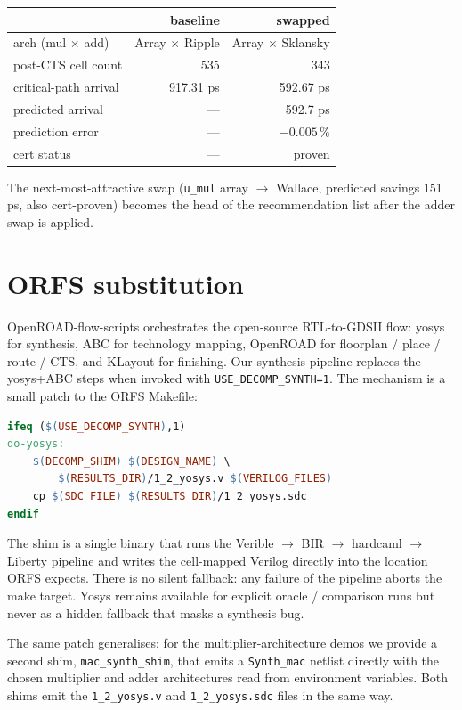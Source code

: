 \documentclass[11pt,a4paper]{article}
\begin{document}
\begin{center}
\begin{tabular}{l r r}
\toprule
& baseline & swapped \\
\midrule
arch (mul $\times$ add) & Array $\times$ Ripple & Array $\times$ Sklansky \\
post-CTS cell count & 535 & 343 \\
critical-path arrival & 917.31 ps & 592.67 ps \\
predicted arrival & --- & 592.7 ps \\
prediction error & --- & $-0.005$\,\% \\
cert status & --- & proven \\
\bottomrule
\end{tabular}
\end{center}

The next-most-attractive swap (\texttt{u\_mul} array $\to$
Wallace, predicted savings 151 ps, also cert-proven) becomes the
head of the recommendation list after the adder swap is applied.

\section{ORFS substitution}
\label{sec:orfs}

OpenROAD-flow-scripts orchestrates the open-source RTL-to-GDSII
flow: yosys for synthesis, ABC for technology mapping, OpenROAD
for floorplan / place / route / CTS, and KLayout for finishing.
Our synthesis pipeline replaces the yosys+ABC steps when invoked
with \texttt{USE\_DECOMP\_SYNTH=1}.  The mechanism is a small
patch to the ORFS Makefile:

\begin{lstlisting}[language=make]
ifeq ($(USE_DECOMP_SYNTH),1)
do-yosys:
    $(DECOMP_SHIM) $(DESIGN_NAME) \
        $(RESULTS_DIR)/1_2_yosys.v $(VERILOG_FILES)
    cp $(SDC_FILE) $(RESULTS_DIR)/1_2_yosys.sdc
endif
\end{lstlisting}

The shim is a single binary that runs the Verible
$\to$ BIR $\to$ hardcaml $\to$ Liberty pipeline and writes the
cell-mapped Verilog directly into the location ORFS expects.
There is no silent fallback: any failure of the pipeline aborts
the make target.  Yosys remains available for explicit
oracle / comparison runs but never as a hidden fallback that masks
a synthesis bug.

The same patch generalises: for the multiplier-architecture demos
we provide a second shim, \texttt{mac\_synth\_shim}, that emits a
\texttt{Synth\_mac} netlist directly with the chosen multiplier
and adder architectures read from environment variables.  Both
shims emit the \texttt{1\_2\_yosys.v} and \texttt{1\_2\_yosys.sdc}
files in the same way.
\end{document}
